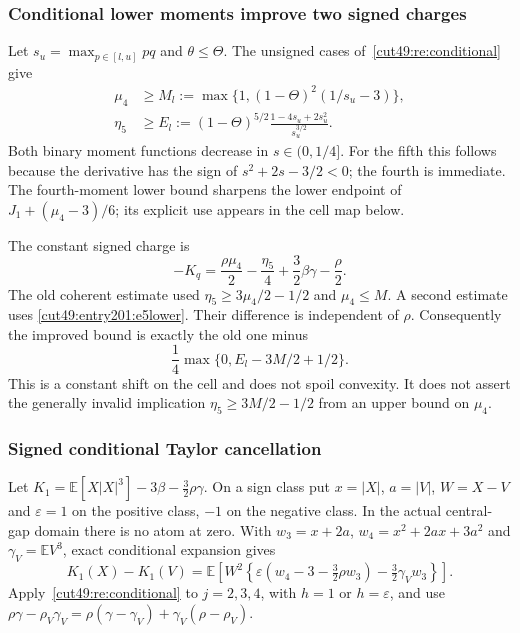 \documentclass[11pt,a4paper]{article}
\numberwithin{equation}{section}
\theoremstyle{definition}
\theoremstyle{remark}
\newcommand{\E}{\mathbb E}
\begin{document}
\subsubsection{Conditional lower moments improve two signed charges}

Let $s_u=\max_{p\in[l,u]}pq$ and $\theta\le\Theta$.
The unsigned cases of~\eqref{cut49:re:conditional} give
\begin{align}
 \mu_4&\ge M_l:=\max\{1,(1-\Theta)^2(1/s_u-3)\},\label{cut49:entry201:m4lower}\\
 \eta_5&\ge E_l:=
 (1-\Theta)^{5/2}\frac{1-4s_u+2s_u^2}{s_u^{3/2}}.\label{cut49:entry201:e5lower}
\end{align}
Both binary moment functions decrease in $s\in(0,1/4]$.
For the fifth this follows because the derivative has the sign of
$s^2+2s-3/2<0$; the fourth is immediate.
The fourth-moment lower bound sharpens the lower endpoint of
$J_1+(\mu_4-3)/6$; its explicit use appears in the cell map below.

The constant signed charge is
\[
 -K_q=\frac{\rho\mu_4}{2}-\frac{\eta_5}{4}
       +\frac32\beta\gamma-\frac{\rho}{2}.
\]
The old coherent estimate used $\eta_5\ge3\mu_4/2-1/2$ and
$\mu_4\le M$. A second estimate uses \eqref{cut49:entry201:e5lower}.
Their difference is independent of $\rho$. Consequently the improved
bound is exactly the old one minus
\begin{equation}\label{cut49:entry201:eta-improvement}
 \frac14\max\{0,E_l-3M/2+1/2\}.
\end{equation}
This is a constant shift on the cell and does not spoil convexity.
It does not assert the generally invalid implication
$\eta_5\ge3M/2-1/2$ from an upper bound on $\mu_4$.

\subsubsection{Signed conditional Taylor cancellation}

Let $K_1=\E[X|X|^3]-3\beta-\tfrac32\rho\gamma$.
On a sign class put $x=|X|$, $a=|V|$, $W=X-V$ and
$\varepsilon=1$ on the positive class, $-1$ on the negative class.
In the actual central-gap domain there is no atom at zero.
With $w_3=x+2a$, $w_4=x^2+2ax+3a^2$ and
$\gamma_V=\E V^3$, exact conditional expansion gives
\begin{equation}\label{cut49:entry201:Kexact}
 K_1(X)-K_1(V)
 =\E\!\left[W^2
 \left\{\varepsilon(w_4-3-\tfrac32\rho w_3)
                   -\tfrac32\gamma_Vw_3\right\}\right].
\end{equation}
Apply~\eqref{cut49:re:conditional} to $j=2,3,4$, with $h=1$
or $h=\varepsilon$, and use
$\rho\gamma-\rho_V\gamma_V
=\rho(\gamma-\gamma_V)+\gamma_V(\rho-\rho_V)$.
\end{document}
